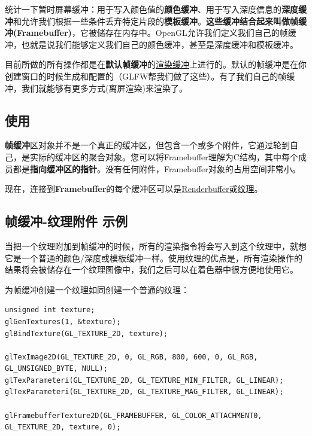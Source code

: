 \documentclass[UTF8,a4paper,12pt]{ctexbook}
\begin{document}
		统计一下暂时屏幕缓冲：用于写入颜色值的\textbf{颜色缓冲}、用于写入深度信息的\textbf{深度缓冲}和允许我们根据一些条件丢弃特定片段的\textbf{模板缓冲}。\textbf{这些缓冲结合起来叫做帧缓冲(Framebuffer)}，它被储存在内存中。OpenGL允许我们定义我们自己的帧缓冲，也就是说我们能够定义我们自己的颜色缓冲，甚至是深度缓冲和模板缓冲。
		
		目前所做的所有操作都是在\textbf{默认帧缓冲}的\underline{渲染缓冲}上进行的。默认的帧缓冲是在你创建窗口的时候生成和配置的（GLFW帮我们做了这些）。有了我们自己的帧缓冲，我们就能够有更多方式(离屏渲染)来渲染了。
	
	
		\subsection{使用}
			
			\textbf{帧缓冲}区对象并不是一个真正的缓冲区，但包含一个或多个附件，它通过轮到自己，是实际的缓冲区的聚合对象。您可以将Framebuffer理解为C结构，其中每个成员都是\textbf{指向缓冲区的指针}。没有任何附件，Framebuffer对象的占用空间非常小。
			
			现在，连接到\textbf{Framebuffer}的每个缓冲区可以是\underline{Renderbuffer}或\underline{纹理}。
		
		
		\subsection{帧缓冲-纹理附件  示例}
			当把一个纹理附加到帧缓冲的时候，所有的渲染指令将会写入到这个纹理中，就想它是一个普通的颜色/深度或模板缓冲一样。使用纹理的优点是，所有渲染操作的结果将会被储存在一个纹理图像中，我们之后可以在着色器中很方便地使用它。
			
			为帧缓冲创建一个纹理如同创建一个普通的纹理：
			\begin{lstlisting}
unsigned int texture;
glGenTextures(1, &texture);
glBindTexture(GL_TEXTURE_2D, texture);

glTexImage2D(GL_TEXTURE_2D, 0, GL_RGB, 800, 600, 0, GL_RGB, GL_UNSIGNED_BYTE, NULL);
glTexParameteri(GL_TEXTURE_2D, GL_TEXTURE_MIN_FILTER, GL_LINEAR);
glTexParameteri(GL_TEXTURE_2D, GL_TEXTURE_MAG_FILTER, GL_LINEAR);

glFramebufferTexture2D(GL_FRAMEBUFFER, GL_COLOR_ATTACHMENT0, GL_TEXTURE_2D, texture, 0);			
			\end{lstlisting}
			
\end{document}
